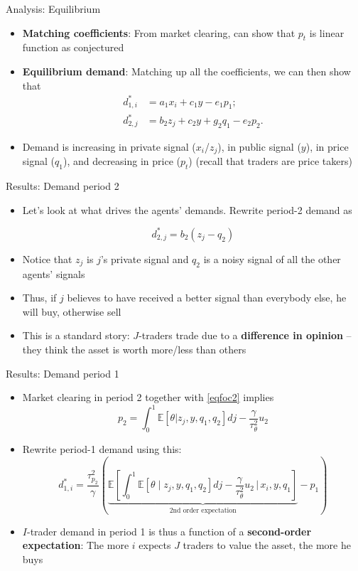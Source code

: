 \documentclass[english,10pt
,aspectratio=169
]{beamer}
\begin{document}
\begin{frame}{Analysis: Equilibrium}
	\begin{itemize}
		\item \textbf{Matching coefficients}: From market clearing, can show that $p_t$ is linear function as conjectured
		\item \textbf{Equilibrium demand}: Matching up all the coefficients, we can then show that
		\begin{align}
		d^*_{1,i} &=  a_1 x_i+c_1 y -e_1 p_1; \label{eqdem1} \\
		d^*_{2,j} &= b_2 z_j+c_2 y + g_2q_1-e_2 p_2. \label{eqdem2}
		\end{align} 
		\item Demand is increasing in private signal ($x_i$/$z_j$), in public signal ($y$), in price signal ($q_1$), and decreasing in price ($p_t$) 
		(recall that traders are price takers)
	\end{itemize}
\end{frame}


\begin{frame}{Results: Demand period 2}
	\begin{itemize}
		\item Let's look at what drives the agents' demands. Rewrite period-2 demand as 
		\begin{block}{}
			\begin{equation} \label{eqdem2z}
			d^*_{2,j} = b_2 (z_j - q_2) 
			\end{equation}
		\end{block}
		\item Notice that $z_j$ is $j$'s private signal and  $q_2$ is a noisy signal of all the other agents' signals
		\item Thus, if $j$ believes to have received a better signal than everybody else, he will buy, otherwise sell
		\item This is a standard story: $J$-traders trade due to a \textbf{difference in opinion} -- they think the asset is worth more/less than others
	\end{itemize}
\end{frame}


\begin{frame}{Results: Demand period 1}
	\begin{itemize}
		\item Market clearing in period 2 together with \eqref{eqfoc2} implies
		\[
		p_2 = \int_0^1 \mathbb{E}[\theta|z_j, y , q_1, q_2] dj - \frac{\gamma}{\tau^2_\theta}u_2
		\]
		\item Rewrite period-1 demand using this:
		\[
			d^*_{1,i} = \frac{\tau^2_{p_2}}{\gamma} \left( \underbrace{\mathbb{E}\left[ \int_0^1 \mathbb{E}[\theta \mid z_j, y , q_1, q_2 ] dj -\frac{\gamma}{\tau^2_\theta}u_2 \,\bigg|\, x_i,y,q_1 \right]}_{\text{2nd order expectation}}-p_1 \right)
		\]
		\item $I$-trader demand in period 1 is thus a function of a \textbf{second-order expectation}: 
		The more $i$ expects $J$ traders to value the asset, the more he buys 
	\end{itemize}
\end{frame}
\end{document}
